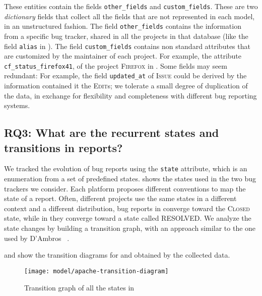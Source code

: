 These entities contain the fields \texttt{other\_fields} and \texttt{custom\_fields}.
These are two \emph{dictionary} fields that collect all the fields that are not represented in each model, in an unstructured fashion.
The field \texttt{other\_fields} contains the information from a specific bug tracker, shared in all the projects in that database (like the field \texttt{alias} in \bzilla).
The field \texttt{custom\_fields} contains non standard attributes that are customized by the maintainer of each project.
For example, the attribute \texttt{cf\_status\_firefox41}, of the project \textsc{Firefox} in \bzilla.
Some fields may seem redundant: For example, the field \texttt{updated\_at} of \textsc{Issue} could be derived by the information contained it the \textsc{Edit}s; we tolerate a small degree of duplication of the data, in exchange for flexibility and completeness with different bug reporting systems.




\subsection*{RQ3: What are the recurrent states and transitions in reports?} \label{sec:model-approach-states}

We tracked the evolution of bug reports using the \texttt{state} attribute, which is an enumeration from a set of predefined states.
 shows the states used in the two bug trackers we consider.
Each platform proposes different conventions to map the state of a report.
Often, different projects use the same states in a different context and a different distribution, \eg bug reports in \jira converge toward the \textsc{Closed} state, while in \bzilla they converge toward a state called \textsc{RESOLVED}.
We analyze the state changes by building a transition graph, with an approach similar to the one used by D'Ambros \etal~\cite{DAmb2007b}.

 and  show the transition diagrams for \jira and \bzilla obtained by the collected data.

\begin{figure*}[h!]
\centering
\texttt{[image: model/apache-transition-diagram]}
\caption{Transition graph of all the states in \jira}
\label{fig:apache_transitions}
\end{figure*}

